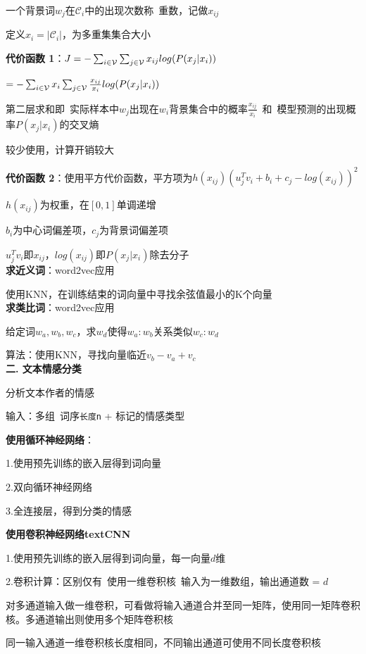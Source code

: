 \documentclass[UTF8]{ctexart}
\begin{document}
  \quad 一个背景词$w_j$在$\mathcal{C}_i$中的出现次数称\ 重数，记做$x_{ij}$

  \quad 定义$x_i = |\mathcal{C}_i|$，为多重集集合大小

  \textbf{代价函数 1}：$J = -\sum_{i\in \mathcal{V} }\sum_{j\in \mathcal{V} }x_{ij} \space log(P(x_j | x_i))$  

  \quad $= -\sum_{i\in \mathcal{V} }x_{i} \sum_{j\in \mathcal{V} } \frac{x_{ij}}{x_i}\space log(P(x_j | x_i))$

  \quad 第二层求和即\ 实际样本中$w_j$出现在$w_i$背景集合中的概率$\frac{x_{ij}}{x_i}$\ 和\ 模型预测的出现概率$P(x_j | x_i)$的交叉熵

  \quad * 较少使用，计算开销较大

  \textbf{代价函数 2}：使用平方代价函数，平方项为$h(x_{ij})(u_j^Tv_i + b_i + c_j -log(x_{ij}))^2$

  \quad $h(x_{ij})$为权重，在$[0, 1]$单调递增

  \quad $b_i$为中心词偏差项，$c_j$为背景词偏差项

  \quad $u_j^Tv_i$即$x_{ij}$，$log(x_{ij})$即$P(x_j|x_i)$除去分子\\
\textbf{求近义词}：word2vec应用

  使用KNN，在训练结束的词向量中寻找余弦值最小的K个向量\\
\textbf{求类比词}：word2vec应用

  给定词$w_a, w_b, w_c$，求$w_d$使得$w_a : w_b$关系类似$w_c:w_d$

  算法：使用KNN，寻找向量临近$v_b - v_a + v_c$\\
\textbf{二. 文本情感分类}

  分析文本作者的情感

  输入：多组\ 词序\texttt{长度n} + 标记的情感类型

  \textbf{使用循环神经网络}：

  \quad 1.使用预先训练的嵌入层得到词向量

  \quad 2.双向循环神经网络

  \quad 3.全连接层，得到分类的情感

  \textbf{使用卷积神经网络textCNN}

  \quad 1.使用预先训练的嵌入层得到词向量，每一向量$d$维

  \quad 2.卷积计算：区别仅有\ 使用一维卷积核\ 输入为一维数组，输出通道数 = $d$

  \quad \quad 对多通道输入做一维卷积，可看做将输入通道合并至同一矩阵，使用同一矩阵卷积核。多通道输出则使用多个矩阵卷积核

  \quad \quad 同一输入通道一维卷积核长度相同，不同输出通道可使用不同长度卷积核
\end{document}
